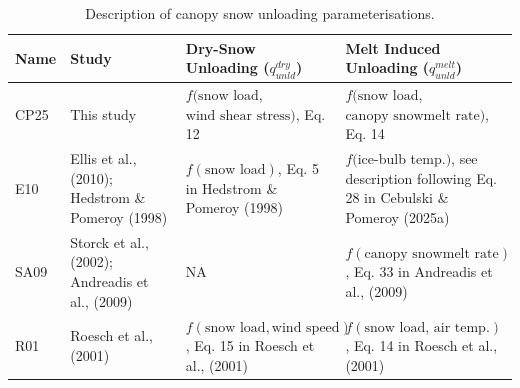 \documentclass[
  letterpaper,
]{tex/uofsthesis-cs}
\begin{document}
\begin{landscape}

\begin{longtable}[]{@{}
  >{\raggedright\arraybackslash}p{}
  >{\raggedright\arraybackslash}p{}
  >{\raggedright\arraybackslash}p{}
  >{\raggedright\arraybackslash}p{}@{}}

\caption{\label{tbl-model-desc}Description of canopy snow unloading
parameterisations.}

\tabularnewline

\toprule\noalign{}
\begin{minipage}[b]{\linewidth}\raggedright
Name
\end{minipage} & \begin{minipage}[b]{\linewidth}\raggedright
Study
\end{minipage} & \begin{minipage}[b]{\linewidth}\raggedright
Dry-Snow Unloading (\(q_{unld}^{dry}\))
\end{minipage} & \begin{minipage}[b]{\linewidth}\raggedright
Melt Induced Unloading (\(q_{unld}^{melt}\))
\end{minipage} \\
\midrule\noalign{}
\endhead
\bottomrule\noalign{}
\endlastfoot
CP25 & This study &
\(f(\text{snow load}\),\newline \(\text{wind shear stress})\), Eq. 12 &
\(f(\text{snow load}\),\newline \(\text{canopy snowmelt rate})\), Eq.
14 \\
E10 & Ellis et al., (2010); Hedstrom \& Pomeroy (1998) &
\(f(\text{snow load})\), Eq. 5 in Hedstrom \& Pomeroy (1998) &
\(f(\)ice-bulb temp.\()\), see description following Eq. 28 in Cebulski
\& Pomeroy (2025a) \\
SA09 & Storck et al., (2002); Andreadis et al., (2009) & NA &
\(f(\text{canopy snowmelt rate})\), Eq. 33 in Andreadis et al.,
(2009) \\
R01 & Roesch et al., (2001) &
\(f(\text{snow load}, \text{wind speed})\), Eq. 15 in Roesch et al.,
(2001) & \(f(\text{snow load, air temp.})\), Eq. 14 in Roesch et al.,
(2001) \\

\end{longtable}

\end{landscape}
\end{document}
